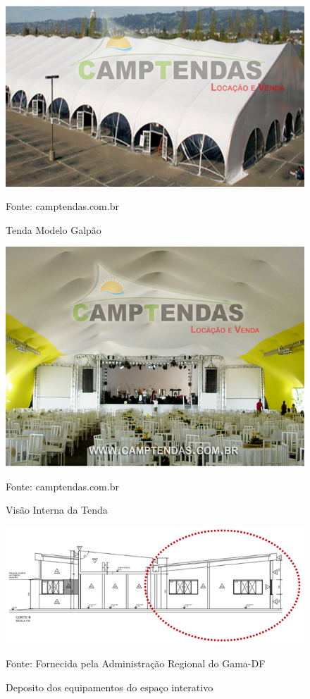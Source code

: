 \begin{figure}[H]
	 \centering
	\label{Tenda Modelo Padrão}
	 \includegraphics[keepaspectratio=true,scale=0.8]{figuras/TendaModeloGalpao.png}
	 \caption{Tenda Modelo Galpão}
	 \small{Fonte: camptendas.com.br}
\end{figure}

\begin{figure}[H]
	 \centering
	\label{Visão Interna Tenda}
	 \includegraphics[keepaspectratio=true,scale=0.8]{figuras/VisaoInternaTenda.png}
	 \caption{Visão Interna da Tenda}
	 \small{Fonte: camptendas.com.br}
\end{figure}

\begin{figure}[H]
	 \centering
	\label{Deposito Dos Equipamentos}
	 \includegraphics[keepaspectratio=true,scale=0.8]{figuras/DepositoDosEquipamentos.png}
	 \caption{Deposito dos equipamentos do espaço interativo}
	 \small{Fonte: Fornecida pela Administração Regional do Gama-DF}
\end{figure}

